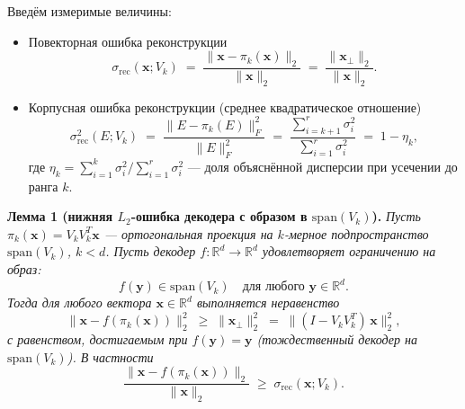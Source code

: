 \documentclass[a4paper, 12pt, oneside, openany]{article}
\begin{document}
Введём измеримые величины:
\begin{itemize}
	\item Повекторная ошибка реконструкции
	\begin{equation}
		\sigma_{\mathrm{rec}}(\mathbf{x}; V_k) \;=\; \frac{\| \mathbf{x} - \pi_k(\mathbf{x}) \|_2}{\|\mathbf{x}\|_2} \;=\; \frac{\| \mathbf{x}_{\perp} \|_2}{\|\mathbf{x}\|_2}.
		\label{eq:3-sigma-rec-def}
	\end{equation}
	\item Корпусная ошибка реконструкции (среднее квадратическое отношение)
	\begin{equation}
		\sigma_{\mathrm{rec}}^{2}(E; V_k) \;=\; \frac{\| E - \pi_k(E) \|_F^{2}}{\| E \|_F^{2}} \;=\; \frac{\sum_{i = k+1}^{r} \sigma_i^{2}}{\sum_{i = 1}^{r} \sigma_i^{2}} \;=\; 1 - \eta_k,
		\label{eq:3-sigma-corpus}
	\end{equation}
	где $\eta_k = \sum_{i=1}^k \sigma_i^2 / \sum_{i=1}^r \sigma_i^2$ --- доля объяснённой дисперсии при усечении до ранга $k$.
\end{itemize}

\textbf{Лемма 1 (нижняя $L_2$-ошибка декодера с образом в $\mathrm{span}(V_k)$).} \emph{Пусть $\pi_k(\mathbf{x}) = V_k V_k^{T} \mathbf{x}$ --- ортогональная проекция на $k$-мерное подпространство $\mathrm{span}(V_k)$, $k < d$. Пусть декодер $f: \mathbb{R}^{d} \to \mathbb{R}^{d}$ удовлетворяет ограничению на образ:}
\begin{equation}
	f(\mathbf{y}) \in \mathrm{span}(V_k) \quad \text{для любого } \mathbf{y} \in \mathbb{R}^{d}.
	\label{eq:3-decoder-restriction}
\end{equation}
\emph{Тогда для любого вектора $\mathbf{x} \in \mathbb{R}^{d}$ выполняется неравенство}
\begin{equation}
	\| \mathbf{x} - f(\pi_k(\mathbf{x})) \|_{2}^{2} \;\geq\; \| \mathbf{x}_{\perp} \|_{2}^{2} \;=\; \| (I - V_k V_k^{T})\, \mathbf{x} \|_{2}^{2},
	\label{eq:3-decoder-lb}
\end{equation}
\emph{с равенством, достигаемым при $f(\mathbf{y}) = \mathbf{y}$ (тождественный декодер на $\mathrm{span}(V_k)$). В частности}
\begin{equation}
	\frac{\| \mathbf{x} - f(\pi_k(\mathbf{x})) \|_{2}}{\|\mathbf{x}\|_{2}} \;\geq\; \sigma_{\mathrm{rec}}(\mathbf{x}; V_k).
	\label{eq:3-decoder-rel}
\end{equation}
\end{document}
